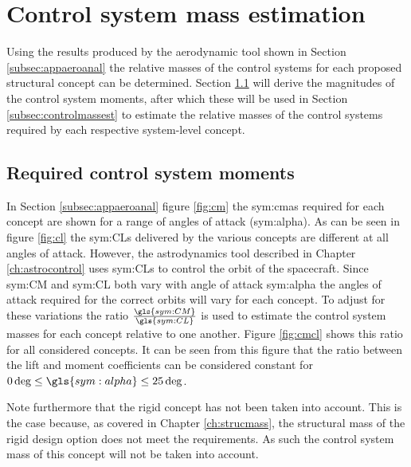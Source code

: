 \section{Control system mass estimation}
\label{sec:controlmass}
Using the results produced by the aerodynamic tool shown in Section \ref{subsec:appaeroanal} the relative masses of the control systems for each proposed structural concept can be determined. Section \ref{subsec:controlmoments} will derive the magnitudes of the control system moments, after which these will be used in Section \ref{subsec:controlmassest} to estimate the relative masses of the control systems required by each respective system-level concept.

\subsection{Required control system moments}
\label{subsec:controlmoments}
In Section \ref{subsec:appaeroanal} figure \ref{fig:cm} the \glspl{sym:cma} required for each concept are shown for a range of angles of attack (\gls{sym:alpha}). As can be seen in figure \ref{fig:cl} the \glspl{sym:CL} delivered by the various concepts are different at all angles of attack. However, the astrodynamics tool described in Chapter \ref{ch:astrocontrol} uses \glspl{sym:CL} to control the orbit of the spacecraft. Since \gls{sym:CM} and \gls{sym:CL} both vary with angle of attack \gls{sym:alpha} the angles of attack required for the correct orbits will vary for each concept. To adjust for these variations the ratio $\frac{\gls{sym:CM}}{\gls{sym:CL}}$ is used to estimate the control system masses for each concept relative to one another. Figure \ref{fig:cmcl} shows this ratio for all considered concepts. It can be seen from this figure that the ratio between the lift and moment coefficients can be considered constant for $0\deg\leq\gls{sym:alpha}\leq 25\deg$.

Note furthermore that the rigid concept has not been taken into account. This is the case because, as covered in Chapter \ref{ch:strucmass}, the structural mass of the rigid design option does not meet the requirements. As such the control system mass of this concept will not be taken into account.

